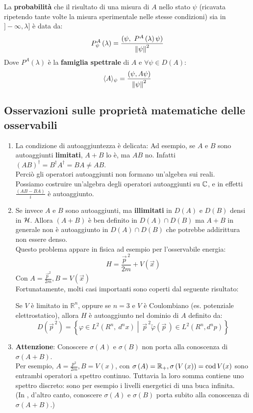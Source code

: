 \documentclass[../../FisicaTeorica.tex]{subfiles}
\begin{document}
\begin{axi}
La \textbf{probabilità} che il risultato di una misura di $A$ nello stato $\psi$ (ricavata ripetendo tante volte la misura sperimentale nelle stesse condizioni) sia in $]-\infty , \lambda]$ è data da:
\[
P_\psi^A\left(\lambda\right)=\frac{(\psi,\ P^A\left(\lambda\right)\psi)}{\norm{\psi}^2}
\]
Dove $P^A\left(\lambda\right)$ è la \textbf{famiglia spettrale} di $A$ e $\forall \psi \in D\left(A\right)$:
\[
\langle A \rangle_\psi = \frac{(\psi, A\psi)}{\left\lVert\psi\right\rVert^2}
\]
\end{axi}

\subsection{Osservazioni sulle proprietà matematiche delle osservabili}
\begin{enumerate}
    \item La condizione di autoaggiuntezza è delicata: 
	Ad esempio, se $A$ e $B$ sono autoaggiunti \textbf{limitati}, $A+B$ lo è, ma $AB$ no. Infatti $\left(AB\right)^\dag=B^\dag A^\dag=BA\neq AB$.\\
	Perciò gli operatori autoaggiunti non formano un'algebra sui reali.\\
	Possiamo costruire un'algebra degli operatori autoaggiunti su $\mathbb{C}$, e in effetti $\frac{\left(AB-BA\right)}{i}$ è autoaggiunto.
	\item Se invece $A$ e $B$ sono autoaggiunti, ma \textbf{illimitati} in $D\left(A\right)$ e $D(B)$ densi in $\mathcal{H}$. Allora $(A+B)$ è ben definito in $D\left(A\right)\cap D\left(B\right)$ ma $A+B$ in generale non è autoaggiunto in $D\left(A\right)\cap D\left(B\right)$ che potrebbe addirittura non essere denso.\\
	Questo problema appare in fisica ad esempio per l'osservabile energia:
	\[
	H=\frac{{\vec{p}}^{\,2}}{2m}+V(\vec{x})
	\]
	Con $A=\frac{{\vec{p}}^2}{2m}, B=V(\vec{x})$\\
	Fortunatamente, molti casi importanti sono coperti dal seguente risultato:
	\begin{thm}
	Se $V$ è limitato in $\mathbb{R}^n$, oppure se $n=3$ e $V$ è Coulombiano (es. potenziale elettrostatico), allora $H$ è autoaggiunto nel dominio di $A$ definito da:
	    \[
	    D\left(\vec{p}^{\>2}\right)=\left\{\varphi\in L^2\left(R^n,\ d^nx\right)\middle|\ {\vec{p}}^{\>2}\widetilde{\varphi}\left(\vec{p}\,\right)\in L^2\left(R^n, d^np\right)\right\}
	    \]
	\end{thm}
	\item \textbf{Attenzione}: Conoscere $\sigma(A)$ e $\sigma(B)$ non porta alla conoscenza di $\sigma(A+B)$.\\
	Per esempio, $A=\frac{p^2}{2m}, B=V\left(x\right)$, con $\sigma \left(A\right)= \mathbb{R}_+, \sigma \left(V\left(x\right)\right)=\operatorname{cod} V(x)$ sono entrambi operatori a spettro continuo. Tuttavia la loro somma contiene uno spettro discreto: sono per esempio i livelli energetici di una buca infinita.\\
	(In \MC, d'altro canto, conoscere $\sigma(A)$ e $\sigma(B)$ porta subito alla conoscenza di $\sigma(A+B)$.)\\
\end{enumerate}
\end{document}
